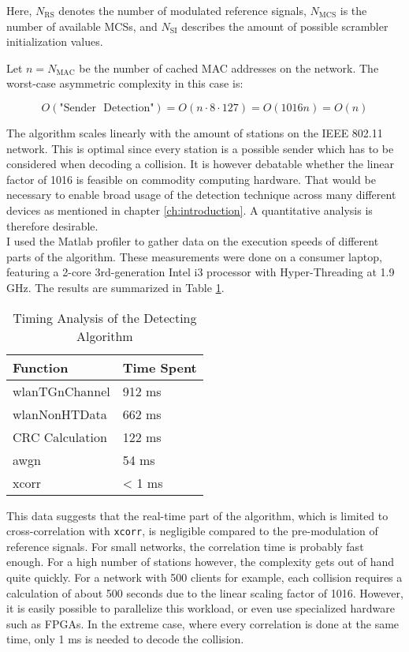 Here, $ N_{\text{RS}} $ denotes the number of modulated reference signals, $ N_{\text{MCS}} $ is the number of available \glspl{MCS}, and $ N_{\text{SI}} $ describes the amount of possible scrambler initialization values.

Let $ n = N_{\text{MAC}} $ be the number of cached \gls{MAC} addresses on the network. The worst-case asymmetric complexity in this case is:

$$ O(\text{"Sender ~Detection"}) = O(n \cdot 8 \cdot 127) = O(1016 n) = O(n) $$\vspace{0cm}

The algorithm scales linearly with the amount of stations on the IEEE 802.11 network. This is optimal since every station is a possible sender which has to be considered when decoding a collision. It is however debatable whether the linear factor of 1016 is feasible on commodity computing hardware. That would be necessary to enable broad usage of the detection technique across many different devices as mentioned in chapter \ref{ch:introduction}. A quantitative analysis is therefore desirable.\\

I used the Matlab profiler to gather data on the execution speeds of different parts of the algorithm. These measurements were done on a consumer laptop, featuring a 2-core 3rd-generation Intel i3 processor with Hyper-Threading at 1.9 GHz. The results are summarized in Table \ref{tbl:timing}.

\begin{table}[ht]
	\centering
	\begin{tabular}{|p{8.5cm}|p{2.5cm}|}
		\hline
		\textbf{Function} & \textbf{Time Spent} \\ \hline
	    wlanTGnChannel & 912 ms \\ \hline
    	wlanNonHTData & 662 ms \\ \hline
	    CRC Calculation & 122 ms \\ \hline
	    awgn & 54 ms \\ \hline
		xcorr & < 1 ms \\ \hline
	\end{tabular}
	\caption{Timing Analysis of the Detecting Algorithm \label{tbl:timing}}
\end{table}

This data suggests that the real-time part of the algorithm, which is limited to cross-correlation with \texttt{xcorr}, is negligible compared to the pre-modulation of reference signals. For small networks, the correlation time is probably fast enough. For a high number of stations however, the complexity gets out of hand quite quickly. For a network with 500 clients for example, each collision requires a calculation of about 500 seconds due to the linear scaling factor of 1016. However, it is easily possible to parallelize this workload, or even use specialized hardware such as \glspl{FPGA}. In the extreme case, where every correlation is done at the same time, only 1 ms is needed to decode the collision.

